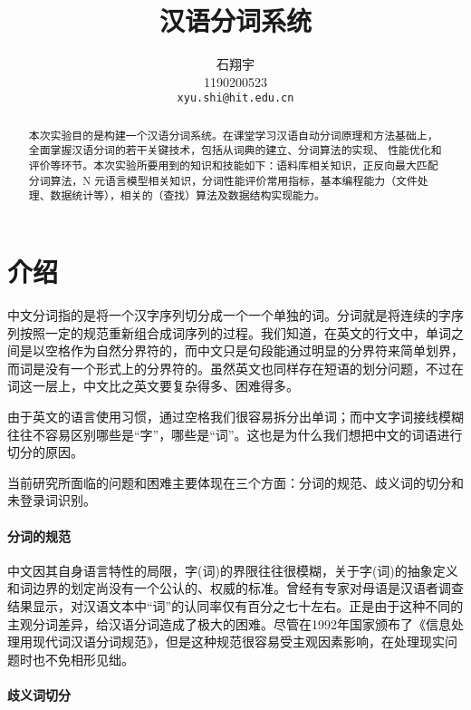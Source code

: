 \documentclass[11pt,a4paper]{article}
\title{汉语分词系统}
\author{石翔宇\\
  1190200523\\
  \texttt{xyu.shi@hit.edu.cn} \\}
\date{}
\begin{document}
\maketitle
\begin{abstract}
    本次实验目的是构建一个汉语分词系统。在课堂学习汉语自动分词原理和方法基础上，全面掌握汉语分词的若干关键技术，包括从词典的建立、分词算法的实现、 性能优化和评价等环节。本次实验所要用到的知识和技能如下：语料库相关知识，正反向最大匹配分词算法，N 元语言模型相关知识，分词性能评价常用指标，基本编程能力（文件处理、数据统计等），相关的（查找）算法及数据结构实现能力。
\end{abstract}

\section{介绍}
\label{Sec:Introduction}
中文分词指的是将一个汉字序列切分成一个一个单独的词。分词就是将连续的字序列按照一定的规范重新组合成词序列的过程。我们知道，在英文的行文中，单词之间是以空格作为自然分界符的，而中文只是句段能通过明显的分界符来简单划界，而词是没有一个形式上的分界符的。虽然英文也同样存在短语的划分问题，不过在词这一层上，中文比之英文要复杂得多、困难得多。

由于英文的语言使用习惯，通过空格我们很容易拆分出单词；而中文字词接线模糊往往不容易区别哪些是“字”，哪些是“词”。这也是为什么我们想把中文的词语进行切分的原因。

当前研究所面临的问题和困难主要体现在三个方面：分词的规范、歧义词的切分和未登录词识别。

\paragraph{分词的规范}

中文因其自身语言特性的局限，字(词)的界限往往很模糊，关于字(词)的抽象定义和词边界的划定尚没有一个公认的、权威的标准。曾经有专家对母语是汉语者调查结果显示，对汉语文本中“词”的认同率仅有百分之七十左右。正是由于这种不同的主观分词差异，给汉语分词造成了极大的困难。尽管在1992年国家颁布了《信息处理用现代词汉语分词规范》，但是这种规范很容易受主观因素影响，在处理现实问题时也不免相形见绌。

\paragraph{歧义词切分}
\end{document}
